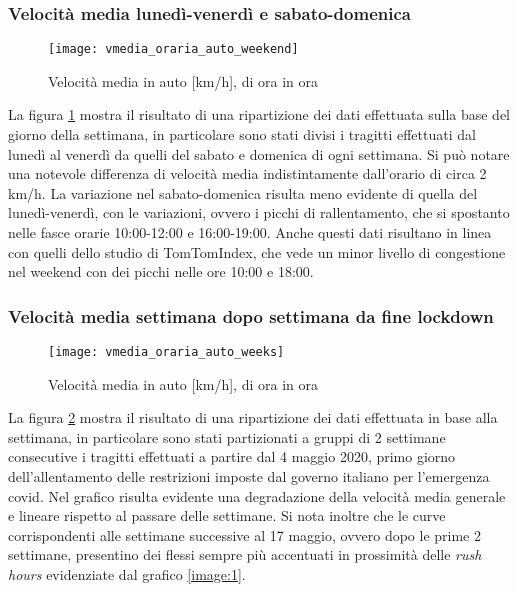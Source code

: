 \subsubsection{Velocità media lunedì-venerdì e sabato-domenica}

\begin{figure}[!h]
	\texttt{[image: vmedia\_oraria\_auto\_weekend]}
	\caption{Velocità media in auto [km/h], di ora in ora}
	\label{image:2}
\end{figure}

La figura \ref{image:2} mostra il risultato di una ripartizione dei dati effettuata sulla base del giorno della settimana, in particolare sono stati divisi i tragitti effettuati dal lunedì al venerdì da quelli del sabato e domenica di ogni settimana. Si può notare una notevole differenza di velocità media indistintamente dall'orario di circa 2 km/h. La variazione nel sabato-domenica risulta meno evidente di quella del lunedì-venerdì, con le variazioni, ovvero i picchi di rallentamento, che si spostanto nelle fasce orarie 10:00-12:00 e 16:00-19:00. Anche questi dati risultano in linea con quelli dello studio di TomTomIndex\cite{tomtomindexmilan}, che vede un minor livello di congestione nel weekend con dei picchi nelle ore 10:00 e 18:00.

\subsubsection{Velocità media settimana dopo settimana da fine lockdown}

\begin{figure}[!h]
	\texttt{[image: vmedia\_oraria\_auto\_weeks]}
	\caption{Velocità media in auto [km/h], di ora in ora}
	\label{image:3}
\end{figure}

La figura \ref{image:3} mostra il risultato di una ripartizione dei dati effettuata in base alla settimana, in particolare sono stati partizionati a gruppi di 2 settimane consecutive i tragitti effettuati a partire dal 4 maggio 2020, primo giorno dell'allentamento delle restrizioni imposte dal governo italiano per l'emergenza covid\cite{dpcm26aprile}. Nel grafico risulta evidente una degradazione della velocità media generale e lineare rispetto al passare delle settimane. Si nota inoltre che le curve corrispondenti alle settimane successive al 17 maggio, ovvero dopo le prime 2 settimane, presentino dei flessi sempre più accentuati in prossimità delle \textit{rush hours} evidenziate dal grafico \ref{image:1}.

